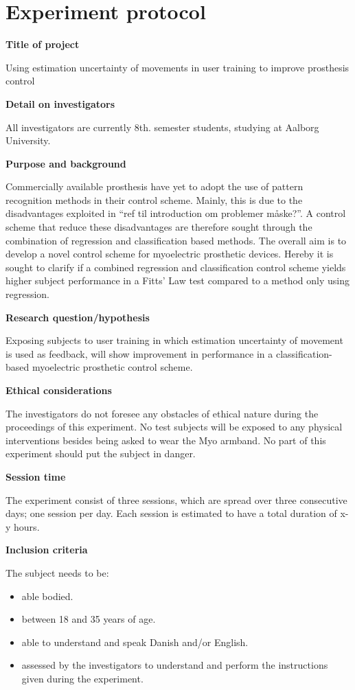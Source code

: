 \section{Experiment protocol}

\textbf{Title of project}

Using estimation uncertainty of movements in user training to improve prosthesis control 

\textbf{Detail on investigators}

All investigators are currently 8th. semester students, studying at Aalborg University.  

\textbf{Purpose and background}

Commercially available prosthesis have yet to adopt the use of pattern recognition methods in their control scheme. Mainly, this is due to the disadvantages exploited in “ref til introduction om problemer måske?”. A control scheme that reduce these disadvantages are therefore sought through the combination of regression and classification based methods. 
The overall aim is to develop a novel control scheme for myoelectric prosthetic devices. Hereby it is sought to clarify if a combined regression and classification control scheme yields higher subject performance in a Fitts’ Law test compared to a method only using regression.

\textbf{Research question/hypothesis}

Exposing subjects to user training in which estimation uncertainty of movement is used as feedback, will show improvement in performance in a classification-based myoelectric prosthetic control scheme.%

\textbf{Ethical considerations}  

The investigators do not foresee any obstacles of ethical nature during the proceedings of this experiment. No test subjects will be exposed to any physical interventions besides being asked to wear the Myo armband. No part of this experiment should put the subject in danger. 

\textbf{Session time} 

The experiment consist of three sessions, which are spread over three consecutive days; one session per day. Each session is estimated to have a total duration of x-y hours. 

\textbf{Inclusion criteria}

The subject needs to be:
\begin{itemize}
	\item able bodied.
	\item between 18 and 35 years of age.
	\item able to understand and speak Danish and/or English.
	\item assessed by the investigators to understand and perform the instructions given during the experiment. 
\end{itemize}


